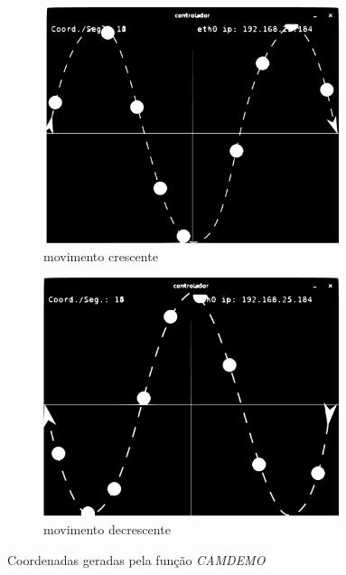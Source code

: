 \begin{figure}[H]
	\centering
	\begin{subfigure}{.5\textwidth}
		\includegraphics[width=0.95\textwidth]{figuras/camdemo_inc.pdf}
		\caption{movimento crescente}
		\label{fig:camdemo_inc}
	\end{subfigure}%
	\begin{subfigure}{.5\textwidth}
		\includegraphics[width=0.95\textwidth]{figuras/camdemo_dec.pdf}
		\caption{movimento decrescente}
		\label{fig:camdemo_dec}
	\end{subfigure}
	\caption{Coordenadas geradas pela função \textit{CAMDEMO}}
	\label{fig:camdemo}	
\end{figure}

